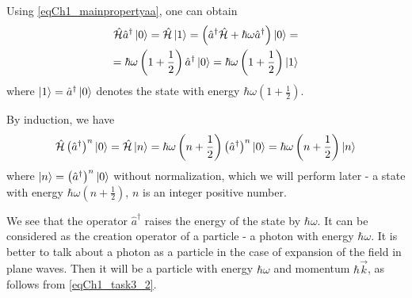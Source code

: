 Using \eqref{eqCh1_mainpropertyaa}, one can obtain
\begin{eqnarray}
\hat{\mathcal{H}} \hat{a}^{\dag}\ket{0} = 
\hat{\mathcal{H}} \ket{1} =
\left(\hat{a}^{\dag} \hat{\mathcal{H}} + \hbar \omega \hat{a}^{\dag} \right)
\ket{0} = 
\nonumber \\
= \hbar \omega \left(1 + \frac{1}{2}\right)
\hat{a}^{\dag} \ket{0} = 
\hbar \omega \left(1 + \frac{1}{2}\right)
\ket{1}
\end{eqnarray}
where $\ket{1} = \hat{a}^{\dag} \ket{0}$ denotes the
state with energy $\hbar \omega \left(1 + \frac{1}{2}\right)$.

By induction, we have
\begin{equation}
\hat{\mathcal{H}} \left(\hat{a}^{\dag}\right)^n\ket{0} = 
\hat{\mathcal{H}} \ket{n} 
= \hbar \omega \left(n + \frac{1}{2}\right)
\left(\hat{a}^{\dag}\right)^n\ket{0} = 
\hbar \omega \left(n + \frac{1}{2}\right)
\ket{n}
\label{eqCh1_aplusinduction}
\end{equation}
where
$\ket{n} = \left(\hat{a}^{\dag}\right)^n\ket{0}$   
without normalization, which we will perform later - a state with energy  
$\hbar \omega \left(n + \frac{1}{2}\right)$,  $n$  is an integer
positive number.

We see that the operator  $\hat{a}^{\dag}$  raises the energy of the state by
$\hbar \omega$.  It can be considered as the creation operator of a
particle - a photon  with energy  $\hbar \omega$.  It is better
to talk about a photon as a particle in the case of expansion of the field in plane waves. Then it will be
a particle with energy $\hbar \omega$ and momentum $\hbar \vec{k}$, as
follows from \eqref{eqCh1_task3_2}. 
  
